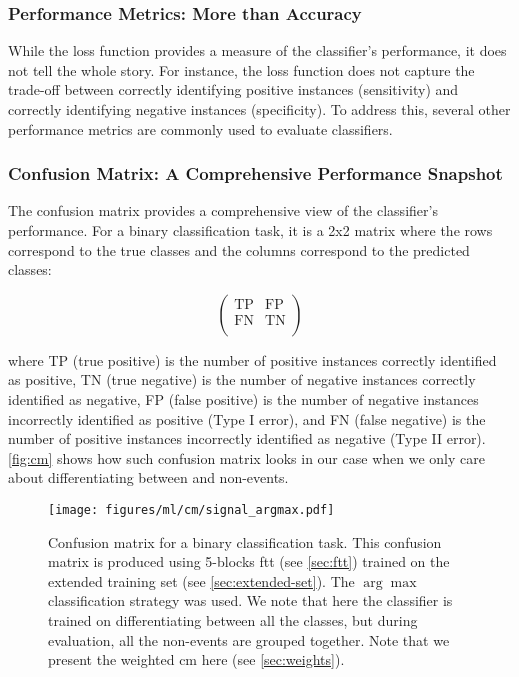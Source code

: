 \subsubsection{Performance Metrics: More than Accuracy}

While the loss function provides a measure of the classifier's performance, it does not tell the whole story. For
instance, the loss function does not capture the trade-off between correctly identifying positive instances
(sensitivity) and correctly identifying negative instances (specificity). To address this, several other performance
metrics are commonly used to evaluate classifiers.

\subsubsection{Confusion Matrix: A Comprehensive Performance Snapshot}
\label{sec:weihted-cm}

The confusion matrix provides a comprehensive view of the classifier's performance. For a binary classification task, it
is a 2x2 matrix where the rows correspond to the true classes and the columns correspond to the predicted classes:

\begin{equation}
    \begin{pmatrix}
        \text{TP} & \text{FP} \\
        \text{FN} & \text{TN} \\
    \end{pmatrix}
\end{equation}

where TP (true positive) is the number of positive instances correctly identified as positive, TN (true negative) is the
number of negative instances correctly identified as negative, FP (false positive) is the number of negative instances
incorrectly identified as positive (Type I error), and FN (false negative) is the number of positive instances
incorrectly identified as negative (Type II error). \autoref{fig:cm} shows how such confusion matrix looks in our case
when we only care about differentiating between \tth and non-\tth events.

\begin{figure}[htb]
    \centering
    \texttt{[image: figures/ml/cm/signal\_argmax.pdf]}
    \caption{Confusion matrix for a binary classification task. This confusion matrix is produced using 5-blocks
        \gls{ftt} (see \autoref{sec:ftt}) trained on the extended training set (see \autoref{sec:extended-set}). The
        $\arg\max$ classification strategy was used.  We note that here the classifier is trained on
        differentiating between all the classes, but during evaluation, all the non-\tth events are grouped together.
        Note that we present the weighted \gls{cm} here (see \autoref{sec:weights}).}
    \label{fig:cm}
\end{figure}

